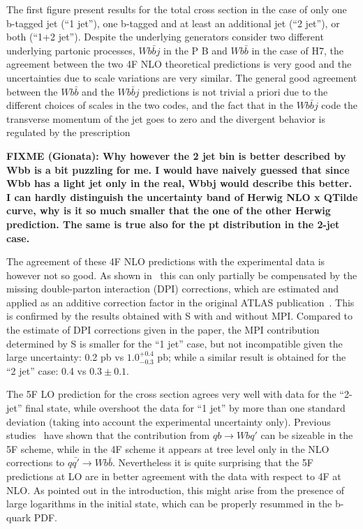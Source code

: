 \documentclass[11pt]{cernrep}
\newcommand{\Sherpa}{S\protect\scalebox{0.8}{HERPA}\xspace}
\newcommand{\Herwig}{H\protect\scalebox{0.8}{ERWIG}7\xspace}
\newcommand{\POWHEGBOX}{P\protect\scalebox{0.8}{OWHEG} B\protect\scalebox{0.8}{OX}\xspace}
\begin{document}
The first figure present results for the total cross section in the
case of only one b-tagged jet (``1 jet''), one b-tagged and at least
an additional jet (``2 jet''), or both (``1+2 jet''). Despite the
underlying generators consider two different underlying partonic
processes, $Wb\bar{b}j$ in the \POWHEGBOX{} and $Wb\bar{b}$ in the
case of \Herwig, the agreement between the two 4F NLO theoretical
predictions is very good and the uncertainties due to scale variations
are very similar.  The general good agreement between the $Wb\bar{b}$
and the $Wb\bar{b}j$ predictions is not trivial a priori due to the
different choices of scales in the two codes, and the fact that in the
$Wb\bar{b}j$ code the transverse momentum of the jet goes to zero and
the divergent behavior is regulated by the \MiNLO{}
prescription~\cite{Luisoni:2015mpa}

{\bf FIXME (Gionata): Why however the 2 jet bin is better described by
  Wbb is a bit puzzling for me. I would have naively guessed that
  since Wbb has a light jet only in the real, Wbbj would describe this
  better. I can hardly distinguish the uncertainty band of Herwig NLO
  x QTilde curve, why is it so much smaller that the one of the other
  Herwig prediction. The same is true also for the pt distribution in
  the 2-jet case.}

The agreement of these 4F NLO predictions with the experimental data is however not so
good. As shown in~\cite{Luisoni:2015mpa} this can only partially be
compensated by the missing double-parton interaction (DPI)
corrections, which are estimated and applied as an additive correction
factor in the original ATLAS publication~\cite{Aad:2013vka}.
This is confirmed by the results obtained with \Sherpa with and without MPI.  
Compared to the estimate of DPI corrections given in the paper, the MPI contribution determined by \Sherpa is smaller for the ``1 jet''
case, but not incompatible given the large uncertainty: 0.2 pb vs $1.0^{+0.4}_{-0.3}$ pb; while a similar result is obtained
for the ``2 jet'' case: 0.4 vs $0.3\pm0.1$. 

The 5F LO prediction for the cross section agrees very well with data for the ``2-jet'' final state, while overshoot the data for ``1 jet'' by
more than one standard deviation (taking into account the experimental uncertainty only). Previous studies~\cite{Caola:2011pz}
have shown that the contribution from $qb \to Wbq'$ can be sizeable in the 5F scheme, while in the 4F scheme it appears at tree
level only in the NLO corrections to $q\bar{q'}\to Wb\bar{b}$. Nevertheless it is quite surprising that the 5F predictions at LO are in better
agreement with the data with respect to 4F at NLO. As pointed out in the introduction, this might arise from the presence of
large logarithms in the initial state, which can be properly resummed in the b-quark PDF. 
\end{document}
